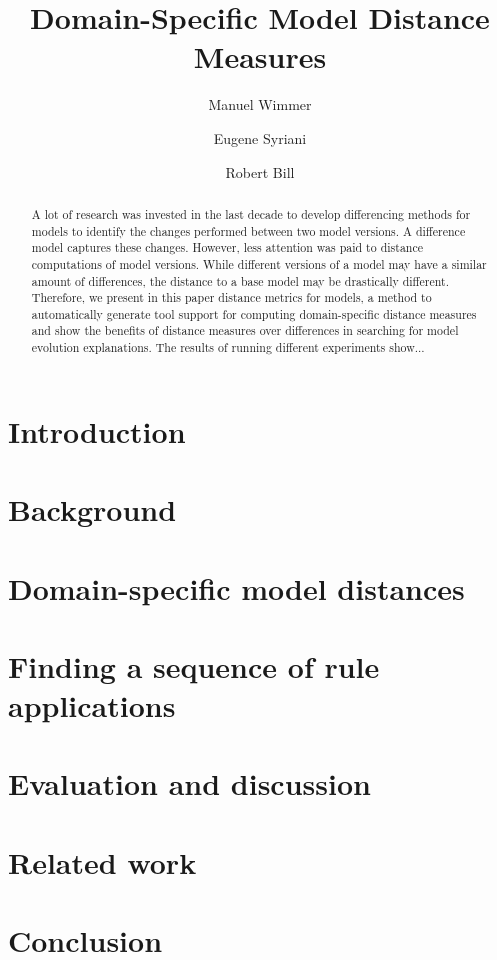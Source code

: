 \documentclass{llncs}
\newcommand\es[1]{\nb{ES}{\textcolor{red}{\textsl{#1}}}}
\begin{document}
    
\title{Domain-Specific Model Distance Measures}

\author{Manuel Wimmer \and Eugene Syriani \and Robert Bill}

\maketitle

\begin{abstract}
A lot of research was invested in the last decade to develop differencing methods for models to identify the changes performed between two model versions.
A difference model captures these changes. However, less attention was paid to distance computations of model versions. While different versions of a model may have a similar amount of differences,
the distance to a base model may be drastically different. Therefore, we present in this paper distance metrics for models, a method to automatically generate tool support for computing domain-specific distance measures and show the benefits of distance measures over differences in searching for model evolution explanations. The results of running different experiments show...\es{todo}
\end{abstract}


\section{Introduction}\label{sec:intro}


\section{Background}\label{sec:background}


\section{Domain-specific model distances}\label{sec:metrics}


\section{Finding a sequence of rule applications}\label{sec:momot}


\section{Evaluation and discussion}\label{sec:eval}


\section{Related work}\label{sec:rw}


\section{Conclusion}\label{sec:conclusion}




\end{document}
